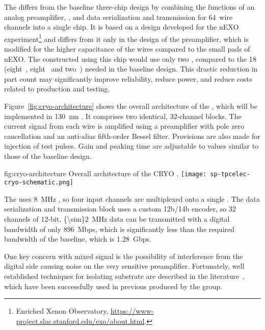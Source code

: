 The    differs from the baseline three-chip design by combining the functions of an analog preamplifier, , and data serialization and transmission for \num{64}~wire channels into a single chip.
It is based on a design developed for the nEXO experiment\footnote{Enriched Xenon Observatory, \url{https://www-project.slac.stanford.edu/exo/about.html}.} and differs from it only in the design of the preamplifier, which is modified for the higher capacitance of the   wires compared to the small pads of nEXO.
The  constructed using this chip would use only two , compared to the \num{18} (eight~, eight~ and two~) needed in the baseline design.
This drastic reduction in part count may significantly improve  reliability, reduce power, and reduce costs related to production and testing. 

Figure~\ref{fig:cryo-architecture} shows the overall architecture of the  , which will be implemented in \SI{130}{nm} .
It comprises two identical, \num{32}-channel blocks. 
The current signal from each wire is amplified using a preamplifier with pole zero cancellation and an anti-alias fifth-order Bessel filter. 
Provisions are also made for injection of test pulses. 
Gain and peaking time are adjustable to values similar to those of the baseline design.

\begin{dunefigure}
{fig:cryo-architecture}
{Overall architecture of the CRYO .}
\texttt{[image: sp-tpcelec-cryo-schematic.png]}
\end{dunefigure}

The  uses \SI{8}{MHz} , so four input channels are multiplexed onto a single . The data serialization and transmission block uses a custom 12b/14b encoder, so \num{32} channels of \num{12}-bit, \SI{{\sim}2}{MHz} data can be transmitted with a digital bandwidth of only \SI{896}{Mbps}, which is significantly less than the required bandwidth of the baseline, which is \SI{1.28}{Gbps}.

One key concern with mixed signal  is the possibility of interference from the digital side causing noise on the very sensitive preamplifier. 
Fortunately, well established techniques for isolating substrate are described in the literature~\cite{yeh}, which have been successfully used in previous  produced by the  group.%

